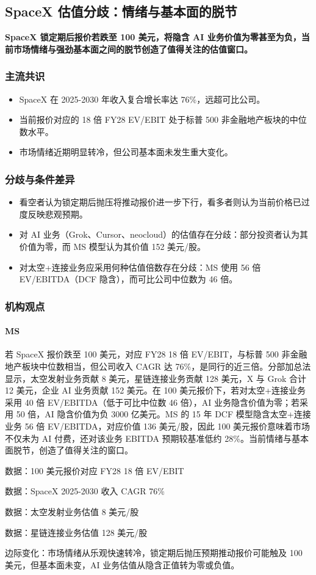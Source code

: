 \documentclass[11pt]{ctexart}
\begin{document}
\subsection{SpaceX 估值分歧：情绪与基本面的脱节}
\textbf{SpaceX 锁定期后报价若跌至 100 美元，将隐含 AI 业务价值为零甚至为负，当前市场情绪与强劲基本面之间的脱节创造了值得关注的估值窗口。}
\subsubsection*{主流共识}
\begin{itemize}
  \item SpaceX 在 2025-2030 年收入复合增长率达 76\%，远超可比公司。
  \item 当前报价对应的 18 倍 FY28 EV/EBIT 处于标普 500 非金融地产板块的中位数水平。
  \item 市场情绪近期明显转冷，但公司基本面未发生重大变化。
\end{itemize}
\subsubsection*{分歧与条件差异}
\begin{itemize}
  \item 看空者认为锁定期后抛压将推动报价进一步下行，看多者则认为当前价格已过度反映悲观预期。
  \item 对 AI 业务（Grok、Cursor、neocloud）的估值存在分歧：部分投资者认为其价值为零，而 MS 模型认为其价值 152 美元/股。
  \item 对太空+连接业务应采用何种估值倍数存在分歧：MS 使用 56 倍 EV/EBITDA（DCF 隐含），而可比公司中位数为 46 倍。
\end{itemize}
\subsubsection*{机构观点}
\paragraph{MS} 若 SpaceX 报价跌至 100 美元，对应 FY28 18 倍 EV/EBIT，与标普 500 非金融地产板块中位数相当，但公司收入 CAGR 达 76\%，是同行的近三倍。分部加总法显示，太空发射业务贡献 8 美元，星链连接业务贡献 128 美元，X 与 Grok 合计 12 美元，企业 AI 业务贡献 152 美元。在 100 美元报价下，若对太空+连接业务采用 40 倍 EV/EBITDA（低于可比中位数 46 倍），AI 业务隐含价值为零；若采用 50 倍，AI 隐含价值为负 3000 亿美元。MS 的 15 年 DCF 模型隐含太空+连接业务 56 倍 EV/EBITDA，对应价值 136 美元/股，因此 100 美元报价意味着市场不仅未为 AI 付费，还对该业务 EBITDA 预期较基准低约 28\%。当前情绪与基本面脱节，创造了值得关注的窗口。
{\small\color{refgray}数据：100 美元报价对应 FY28 18 倍 EV/EBIT\par}
{\small\color{refgray}数据：SpaceX 2025-2030 收入 CAGR 76\%\par}
{\small\color{refgray}数据：太空发射业务估值 8 美元/股\par}
{\small\color{refgray}数据：星链连接业务估值 128 美元/股\par}
{\small\color{refgray}边际变化：市场情绪从乐观快速转冷，锁定期后抛压预期推动报价可能触及 100 美元，但基本面未变，AI 业务估值从隐含正值转为零或负值。\par}
\end{document}
